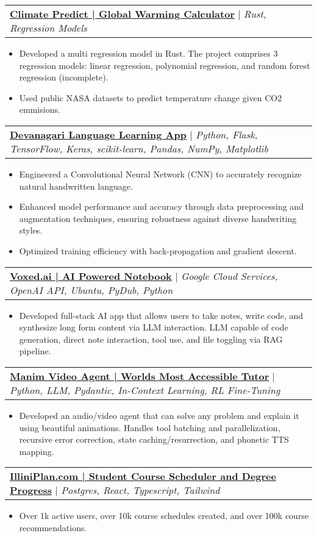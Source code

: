 \documentclass[letterpaper,10.99999999999999pt]{article}
\makeatletter
\newcommand{\resumeItem}[1]{
  \item\small{
    {#1 \vspace{-1pt}}
  }
}
\newcommand{\resumeProjectHeading}[2]{
    \item
    \begin{tabular*}{0.97\textwidth}{l@{\extracolsep{\fill}}r}
      \small#1 & #2 \\
    \end{tabular*}\vspace{-6pt}
}
\newcommand{\resumeItemListStart}{\begin{itemize}}
\newcommand{\resumeItemListEnd}{\end{itemize}\vspace{-5pt}}
\makeatother
\begin{document}
        \resumeProjectHeading
          {\textbf{\href{https://www.aidanandrews.info/projects/climatepredict}{Climate Predict | Global Warming Calculator}} $|$ \emph{Rust, Regression Models}}{}
          \resumeItemListStart
            \resumeItem{Developed a multi regression model in Rust. The project comprises 3 regression models: linear regression, polynomial regression, and random forest regression (incomplete).}
            \resumeItem{Used public NASA datasets to predict temperature change given CO2 emmisions.}
          \resumeItemListEnd
          
      \resumeProjectHeading
          {\textbf{\href{https://www.aidanandrews.info/projects/devanagari-web-app}{Devanagari Language Learning App}} $|$ \emph{Python, Flask, TensorFlow, Keras, scikit-learn, Pandas, NumPy, Matplotlib}}{}
          \resumeItemListStart
            \resumeItem{Engineered a Convolutional Neural Network (CNN) to accurately recognize natural handwritten language.}
            \resumeItem{Enhanced model performance and accuracy through data preprocessing and augmentation techniques, ensuring robustness against diverse handwriting styles.}
            \resumeItem{Optimized training efficiency with back-propagation and gradient descent.}
          \resumeItemListEnd

      \resumeProjectHeading
        {\textbf{\href{https://www.aidanandrews.info/projects/voxed}{Voxed.ai | AI Powered Notebook}} $|$ \emph{Google Cloud Services, OpenAI API, Ubuntu, PyDub, Python}}{}
        \resumeItemListStart
          \resumeItem{Developed full-stack AI app that allows users to take notes, write code, and synthesize long form content via LLM interaction. LLM capable of code generation, direct note interaction, tool use, and file toggling via RAG pipeline.}
        \resumeItemListEnd
        
      \resumeProjectHeading
        {\textbf{\href{https://github.com/aidanandrews22/manim-video-agent}{Manim Video Agent | Worlds Most Accessible Tutor}} $|$ \emph{Python, LLM, Pydantic, In-Context Learning, RL Fine-Tuning}}{}
        \resumeItemListStart
          \resumeItem{Developed an audio/video agent that can solve any problem and explain it using beautiful animations. Handles tool batching and parallelization, recursive error correction, state caching/resurrection, and phonetic TTS mapping.}
        \resumeItemListEnd

      \resumeProjectHeading
        {\textbf{\href{https://www.aidanandrews.info/projects/illini-plan}{IlliniPlan.com | Student Course Scheduler and Degree Progress}} $|$ \emph{Postgres, React, Typescript, Tailwind}}{}
        \resumeItemListStart
        \resumeItem{Over 1k active users, over 10k course schedules created, and over 100k course recommendations.}
        \resumeItemListEnd
        
\end{document}
